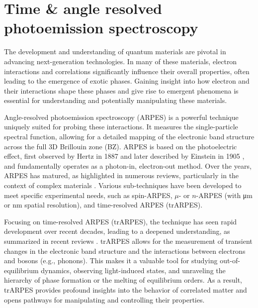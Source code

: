 \chapter{Time \& angle resolved photoemission spectroscopy}

The development and understanding of quantum materials are pivotal in advancing next-generation technologies.
In many of these materials, electron interactions and correlations significantly influence their overall properties, often leading to the emergence of exotic phases.
Gaining insight into how electron and their interactions shape these phases and give rise to emergent phenomena is essential for understanding and potentially manipulating these materials.

Angle-resolved photoemission spectroscopy (ARPES) is a powerful technique uniquely suited for probing these interactions.
It measures the single-particle spectral function, allowing for a detailed mapping of the electronic band structure across the full 3D Brillouin zone (BZ).
ARPES is based on the photoelectric effect, first observed by Hertz in 1887 \cite{hertz_ueber_1887} and later described by Einstein in 1905 \cite{einstein_uber_1905}, and fundamentally operates as a photon-in, electron-out method.
Over the years, ARPES has matured, as highlighted in numerous reviews, particularly in the context of complex materials \cite{damascelli_angle-resolved_2003,damascelli_angle-resolved_2003,lu_angle-resolved_2012,gedik_photoemission_2017,lv_angle-resolved_2019,zhang_angle-resolved_2022}.
Various sub-techniques have been developed to meet specific experimental needs, such as spin-ARPES, $\mu$- or $n$-ARPES (with \unit{\micro\meter} or \unit{\nano\meter} spatial resolution), and time-resolved ARPES (trARPES).

Focusing on time-resolved ARPES (trARPES), the technique has seen rapid development over recent decades, leading to a deepened understanding, as summarized in recent reviews \cite{smallwood_ultrafast_2016,huang_high-resolution_2022,boschini_time-resolved_2024}.
trARPES allows for the measurement of transient changes in the electronic band structure and the interactions between electrons and bosons (e.g., phonons).
This makes it a valuable tool for studying out-of-equilibrium dynamics, observing light-induced states, and unraveling the hierarchy of phase formation or the melting of equilibrium orders.
As a result, trARPES provides profound insights into the behavior of correlated matter and opens pathways for manipulating and controlling their properties.

